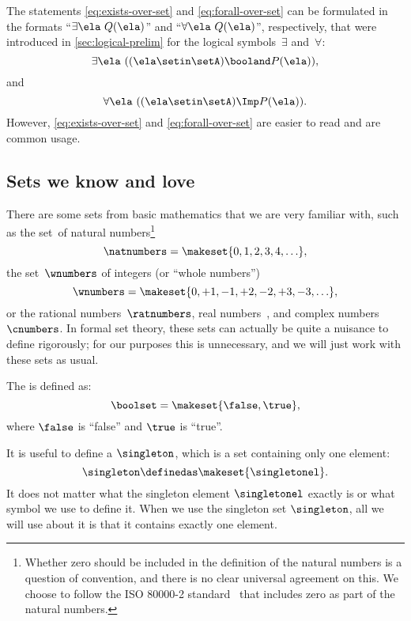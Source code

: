 \begin{remark}
    The statements \cref{eq:exists-over-set} and \cref{eq:forall-over-set} can be formulated in the formats ``$\exists \ela \ Q(\ela)$'' and ``$\forall \ela \ Q(\ela)$'', respectively, that were introduced in \cref{sec:logical-prelim} for the logical symbols~$\exists$ and~$\forall$:
    \begin{equation}
        \exists \ela \  ((\ela \setin \setA) \booland P(\ela)),
    \end{equation}
    and
    \begin{equation}
        \forall \ela\  ((\ela\setin \setA) \Imp P(\ela)).
    \end{equation}
    However, \cref{eq:exists-over-set} and \cref{eq:forall-over-set} are easier to read and are common usage.
\end{remark}

\subsection{Sets we know and love}
\label{sec:natnumbers}
\label{sec:wnumbers}
\label{sec:ratnumbers}
\label{sec:reals}

There are some sets from basic mathematics that we are very familiar with, such as
the set~\natnumbers of natural numbers\footnote{
    Whether zero should be included in the definition of the natural numbers is a question of convention, and there is no clear universal agreement on this.
    We choose to follow the ISO 80000-2 standard~\cite{ISO:2009:IQU} that includes zero as part of the natural numbers.
}
%
\begin{equation}
    \natnumbers = \makeset{0, 1, 2, 3, 4, \ldots },
\end{equation}
%
the set~$\wnumbers$ of integers (or ``whole numbers'')
\begin{equation}
    \wnumbers = \makeset{ 0, +1, -1, +2, -2, +3, -3, \ldots},
\end{equation}
%
or the rational numbers~$\ratnumbers$, real numbers~\reals, and complex numbers $\cnumbers$.
In formal set theory, these sets can actually be quite a nuisance to define rigorously; for our purposes this is unnecessary, and we will just work with these sets as usual.

\label{def:booleans}
The  is defined as:
\begin{equation}
    \boolset = \makeset{ \false, \true },
\end{equation}
where $\false$ is ``false'' and $\true$ is ``true''.

\label{def:singleton}
It is useful to define a  $\singleton$, which is a set containing only one element:
\begin{equation}
    \singleton \definedas \makeset{\singletonel}.
\end{equation}
It does not matter what the singleton element $\singletonel$ exactly is or what symbol we use to define it.
When we use the singleton set $\singleton$, all we will use about it is that it contains exactly one element.
